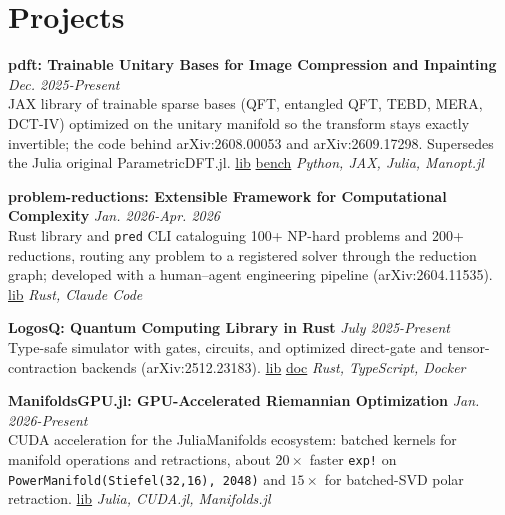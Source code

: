 \documentclass[a4paper,10pt]{article}
\begin{document}
\section*{Projects}

\textbf{pdft: Trainable Unitary Bases for Image Compression and Inpainting} \hfill {\em Dec. 2025-Present} \\
\textcolor{textgray}{JAX library of trainable sparse bases (QFT, entangled QFT, TEBD, MERA, DCT-IV) optimized on the unitary manifold so the transform stays exactly invertible; the code behind arXiv:2608.00053 and arXiv:2609.17298. Supersedes the Julia original ParametricDFT.jl. \href{https://github.com/zazabap/pdft}{lib} \href{https://github.com/zazabap/pdft-benchmarks}{bench}}
\textit{\color{accentgreen}Python, JAX, Julia, Manopt.jl}

\textbf{problem-reductions: Extensible Framework for Computational Complexity} \hfill {\em Jan. 2026-Apr. 2026} \\
\textcolor{textgray}{Rust library and \texttt{pred} CLI cataloguing 100+ NP-hard problems and 200+ reductions, routing any problem to a registered solver through the reduction graph; developed with a human--agent engineering pipeline (arXiv:2604.11535). \href{https://github.com/CodingThrust/problem-reductions/}{lib}}
\textit{\color{accentgreen}Rust, Claude Code}

\textbf{LogosQ: Quantum Computing Library in Rust} \hfill {\em July 2025-Present} \\
\textcolor{textgray}{Type-safe simulator with gates, circuits, and optimized direct-gate and tensor-contraction backends (arXiv:2512.23183). \href{https://github.com/zazabap/LogosQ}{lib} \href{https://logosqbook.vercel.app/}{doc}}
\textit{\color{accentgreen}Rust, TypeScript, Docker}

\textbf{ManifoldsGPU.jl: GPU-Accelerated Riemannian Optimization} \hfill {\em Jan. 2026-Present} \\
\textcolor{textgray}{CUDA acceleration for the JuliaManifolds ecosystem: batched kernels for manifold operations and retractions, about $20\times$ faster \texttt{exp!} on \texttt{PowerManifold(Stiefel(32,16), 2048)} and $15\times$ for batched-SVD polar retraction. \href{https://github.com/JuliaManifolds/ManifoldsGPU.jl}{lib}}
\textit{\color{accentgreen}Julia, CUDA.jl, Manifolds.jl}

\end{document}
